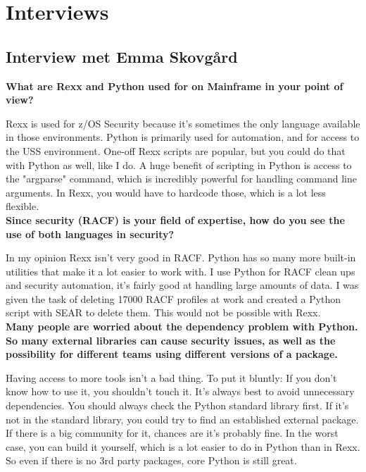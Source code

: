 \chapter{Interviews}%
\label{ch:Interviews}

\section{Interview met Emma Skovgård}
\label{InterviewEmma}
\textbf{What are Rexx and Python used for on Mainframe in your point of view?}

Rexx is used for z/OS Security because it's sometimes the only language available in those environments. Python is primarily used for automation, and for access to the USS environment. One-off Rexx scripts are popular, but you could do that with Python as well, like I do.
A huge benefit of scripting in Python is access to the "argparse" command, which is incredibly powerful for handling command line arguments. In Rexx, you would have to hardcode those, which is a lot less flexible.\\

\textbf{Since security (RACF) is your field of expertise, how do you see the use of both languages in security?}

In my opinion Rexx isn't very good in RACF. Python has so many more built-in utilities that make it a lot easier to work with.
I use Python for RACF clean ups and security automation, it's fairly good at handling large amounts of data.
I was given the task of deleting 17000 RACF profiles at work and created a Python script with SEAR to delete them. This would not be possible with Rexx.\\

\textbf{Many people are worried about the dependency problem with Python. So many external libraries can cause security issues, as well as the possibility for different teams using different versions of a package.}

Having access to more tools isn't a bad thing. To put it bluntly: If you don't know how to use it, you shouldn't touch it. It's always best to avoid unnecessary dependencies. You should always check the Python standard library first. If it's not in the standard library, you could try to find an established external package. If there is a big community for it, chances are it's probably fine. In the worst case, you can build it yourself, which is a lot easier to do in Python than in Rexx. So even if there is no 3rd party packages, core Python is still great.\\

